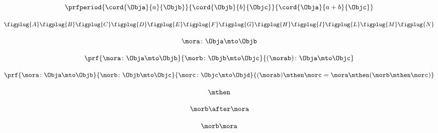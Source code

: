 {\begin{forslides}
        \begin{equation}
            \label{eq:semicats-slides-59}
            \prfperiod{
                \cord{\Obja}{a}{\Objb}
            }{
                \cord{\Objb}{b}{\Objc}
            }{
                \cord{\Obja}{a+b}{\Objc}
            }
        \end{equation}

        \begin{equation}
            \label{eq:semicats-slides-60}
            \centering
            \figplug{A}
            \figplug{B}
            \figplug{C}
            \figplug{D}
            \figplug{E}
            \figplug{F}
            \figplug{G}
            \figplug{H}
            \figplug{I}
            \figplug{L}
            \figplug{M}
            \figplug{N}
        \end{equation}

        \begin{equation}
            \label{eq:semicats-slides-61}
            \mora\colon \Obja \mto \Objb
        \end{equation}

        \begin{equation}
            \label{eq:semicats-slides-62}
            \prf{
                \mora \colon \Obja \mto \Objb
            }{
                \morb\colon \Objb \mto \Objc
            }{
                (\morab )\colon \Obja \mto \Objc
            }
        \end{equation}

        \begin{equation}
            \label{eq:semicats-slides-63}
            \prf{
                \mora \colon \Obja \mto \Objb
            }{
                \morb\colon \Objb \mto \Objc
            }{
                \morc \colon \Objc \mto \Objd
            }{
                (\morab ) \mthen \morc = \mora \mthen ( \morb  \mthen \morc )
            }
        \end{equation}

        \begin{equation}
            \label{eq:semicats-slides-64}
            \mthen
        \end{equation}

        \begin{equation}
            \label{eq:semicats-slides-65}
            \morb\after \mora
        \end{equation}

        \begin{equation}
            \label{eq:semicats-slides-66}
            \morb \mora
        \end{equation}


\end{forslides}}
